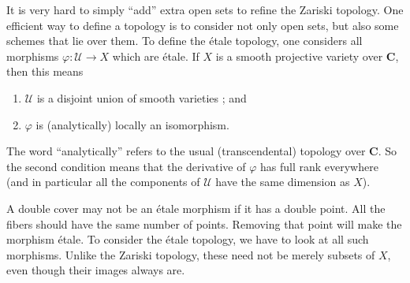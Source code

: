 It is very hard to simply ``add'' extra open sets to refine the Zariski topology. One efficient way to define a topology is to consider not only open sets, but also some schemes that lie over them. To define the \'etale topology, one considers all morphisms $\varphi: \mathcal{U} \to X$ which are \'etale.  If $X$ is a smooth projective variety over $\mathbf{C}$, then this means 
\begin{enumerate}
\item $\mathcal{U}$ is a disjoint union of smooth varieties ; and
\item $\varphi$ is (analytically) locally an isomorphism.
\end{enumerate}
The word ``analytically'' refers to the usual (transcendental) topology over $\mathbf{C}$. So the second condition means that the derivative of $\varphi$ has full rank everywhere (and in particular all the components of $\mathcal{U}$ have the same dimension as $X$).

A double cover may not be an \'etale morphism if it has a double point. All the fibers should have the same number of points. Removing that point will make the morphism \'etale. To consider the \'etale topology, we have to look at all such morphisms. Unlike the Zariski topology, these need not be merely subsets of $X$, even though their images always are.

